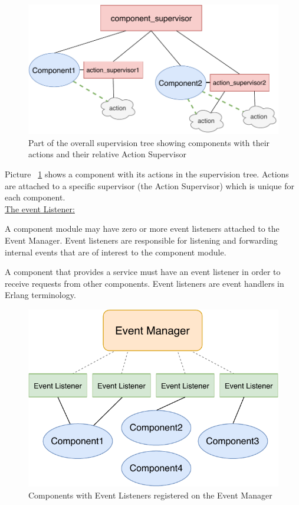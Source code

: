 \documentclass{memoir}
\begin{document}
\begin{figure}
	\centering
	\includegraphics[width=0.7\linewidth]{implementation_details/component_and_action.pdf}
	\caption{Part of the overall supervision tree showing components with their actions and their relative Action Supervisor}
	\label{fig:component-and-action}
\end{figure}

Picture ~\ref{fig:component-and-action} shows a component with its actions in the supervision tree. Actions are attached to a specific supervisor (the Action Supervisor) which is unique for each component.
\\

\underline{The event Listener:}


A component module may have zero or more event listeners attached to the Event Manager. Event listeners are responsible for listening and forwarding internal events that are of interest to the component module.

A component that provides a service must have an event listener in order to receive requests from other components. Event listeners are event handlers in Erlang terminology.

\begin{figure}
	\centering
	\includegraphics[width=0.7\linewidth]{implementation_details/components_event_listeners.pdf}
	\caption{Components with Event Listeners registered on the Event Manager}
	\label{fig:component-event-listeners}
\end{figure}
\end{document}
